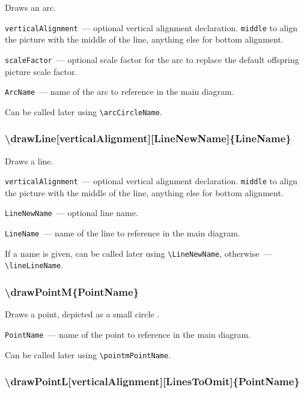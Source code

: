 	Draws an arc.

	\texttt{verticalAlignment}~— optional vertical alignment declaration. \texttt{middle} to align the picture with the middle of the line, anything else for bottom alignment.
	
	\texttt{scaleFactor}~— optional scale factor for the arc to replace the default offspring picture scale factor. 
	
	\texttt{ArcName}~— name of the arc to reference in the main diagram. 
	
	Can be called later using \texttt{\textbackslash arcCircleName}.
	
\subsubsection{\textbackslash drawLine[verticalAlignment][LineNewName]\{LineName\}}

	Draws a line.

	\texttt{verticalAlignment}~— optional vertical alignment declaration. \texttt{middle} to align the picture with the middle of the line, anything else for bottom alignment.
	
	\texttt{LineNewName}~— optional line name. 
	
	\texttt{LineName}~— name of the line to reference in the main diagram. 
	
	If a name is given, can be called later using \texttt{\textbackslash LineNewName}, otherwise~— \texttt{\textbackslash lineLineName}. 
	
\subsubsection{\textbackslash drawPointM\{PointName\}}


	Draws a point, depicted as a small circle .
	
	\texttt{PointName}~— name of the point to reference in the main diagram. 
	
	Can be called later using \texttt{\textbackslash pointmPointName}. 

\subsubsection{\textbackslash drawPointL[verticalAlignment][LinesToOmit]\{PointName\}}\label{drawPointL}

